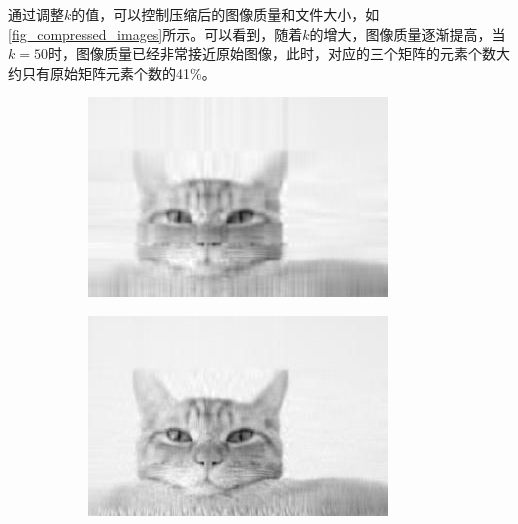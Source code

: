 \begin{solution}
    通过调整\( k \)的值，可以控制压缩后的图像质量和文件大小，如\cref{fig_compressed_images}所示。可以看到，随着\( k \)的增大，图像质量逐渐提高，当\( k=50 \)时，图像质量已经非常接近原始图像，此时，对应的三个矩阵的元素个数大约只有原始矩阵元素个数的41\%。
    \begin{figure}[htb!]
        \centering
        \begin{subfigure}{.3\textwidth}
            \centering
            \includegraphics[width=.9\textwidth]{./img/matrix/cat_approx1.jpg}
            \caption{}
            \label{fig_compressed_images_1}
        \end{subfigure}
        \begin{subfigure}{.3\textwidth}
            \centering
            \includegraphics[width=.9\textwidth]{./img/matrix/cat_approx2.jpg}
            \caption{}
            \label{fig_compressed_images_2}
        \end{subfigure}
        \begin{subfigure}{.3\textwidth}
            \centering

\end{subfigure}
\end{figure}
\end{solution}
